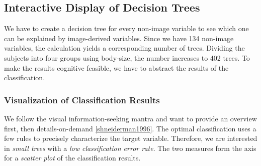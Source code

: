 \documentclass[a4paper,twoside]{style/article}
\begin{document}
\subsection{Interactive Display of Decision Trees}
We have to create a decision tree for every non-image variable to see which one can be explained by image-derived variables.
Since we have 134 non-image variables, the calculation yields a corresponding number of trees.
Dividing the subjects into four groups using body-size, the number increases to 402 trees.
To make the results cognitive feasible, we have to abstract the results of the classification.
\subsubsection{Visualization of Classification Results}
\label{subsec:VisualizationOfClassificationResults}
We follow the visual information-seeking mantra and want to provide an overview first, then details-on-demand \ref{shneiderman1996}.
The optimal classification uses a few rules to precisely characterize the target variable.
Therefore, we are interested in \emph{small trees} with a \emph{low classification error rate}.
The two measures form the axis for a \emph{scatter plot} of the classification results.
\end{document}
